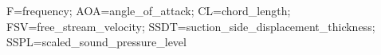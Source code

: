 F=frequency; AOA=angle\_of\_attack; CL=chord\_length; FSV=free\_stream\_velocity; SSDT=suction\_side\_displacement\_thickness; SSPL=scaled\_sound\_pressure\_level